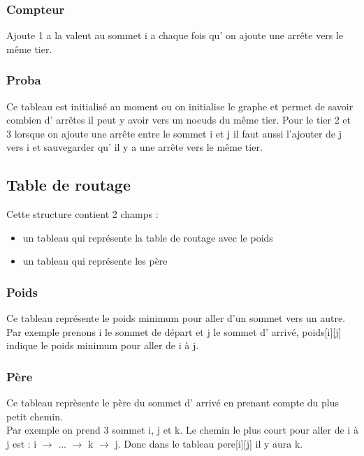 \documentclass{article}
\begin{document}
\subsubsection{Compteur}

Ajoute 1 a la valeut au sommet i a chaque fois qu' on ajoute une arrête vers le même tier.

\subsubsection{Proba}

Ce tableau est initialisé au moment ou on initialise le graphe et permet de savoir combien d' arrêtes il peut y avoir vers un noeuds du même tier. Pour le tier 2 et 3 lorsque on ajoute une arrête entre le sommet i et j il faut aussi l'ajouter de j vers i et sauvegarder qu' il y a une arrête vers le même tier.

\subsection{Table de routage}

Cette structure contient 2 champs : 
\begin{itemize}
    \item un tableau qui représente la table de routage avec le poids
    \item un tableau qui représente les père 
\end{itemize}

\subsubsection{Poids}

Ce tableau représente le poids minimum pour aller d'un sommet vers un autre. Par exemple prenons i le sommet de départ et j le sommet d' arrivé, poids[i][j] indique le poids minimum pour aller de i à j.

\subsubsection{Père}

Ce tableau reprèsente le père du sommet d' arrivé en prenant compte du plus petit chemin.\\
Par exemple on prend 3 sommet i, j et k. Le chemin le plus court pour aller de i à j est : i \begin{math}\rightarrow\end{math} ... \begin{math}\rightarrow\end{math} k \begin{math}\rightarrow\end{math} j. Donc dans le tableau pere[i][j] il y aura k.
\end{document}
